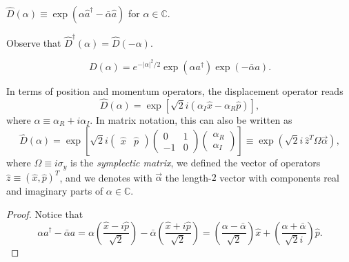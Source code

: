 \documentclass[12pt]{report}
\newcommand{\CC}{\mathbb{C}}
\begin{document}
\begin{defn}
	$\hat D(\alpha) \equiv \exp(\alpha \hat a^\dagger-\bar\alpha \hat a)$ for $\alpha\in\CC$.
\end{defn}
Observe that $\hat D^\dagger(\alpha)=\hat D(-\alpha)$.

\begin{prop}
	\begin{equation}
		D(\alpha)
		= e^{-\lvert\alpha\rvert^2/2}
			\exp(\alpha a^\dagger)\exp(-\bar\alpha a).
	\end{equation}
\end{prop}

\begin{prop}
	In terms of position and momentum operators, the displacement operator reads
	\begin{equation}
		\hat D(\alpha)
		= \exp[\sqrt2 i(\alpha_I \hat x - \alpha_R \hat p)],
	\end{equation}
	where $\alpha\equiv \alpha_R+i\alpha_I$.
	In matrix notation, this can also be written as
	\begin{equation}
		\hat D(\alpha)
		= \exp\left[\sqrt2 i \begin{pmatrix}
			\hat x & \hat p
		\end{pmatrix}
		\begin{pmatrix}
			0 & 1 \\ -1 & 0
		\end{pmatrix}
		\begin{pmatrix}
			\alpha_R \\ \alpha_I
		\end{pmatrix}\right]
		\equiv \exp(\sqrt2 i\, \hat z^T \Omega \vec\alpha),
	\end{equation}
	where $\Omega\equiv i\sigma_y$ is the \emph{symplectic matrix}, we defined the vector of operators $\hat z\equiv (\hat x,\hat p)^T$, and we denotes with $\vec \alpha$ the length-$2$ vector with components real and imaginary parts of $\alpha\in\CC$.
\end{prop}
\begin{proof}
	Notice that
	\begin{equation}
		\alpha a^\dagger - \bar\alpha a
		= \alpha \left(\frac{\hat x-i\hat p}{\sqrt2}\right)
		- \bar\alpha\left(\frac{\hat x + i\hat p}{\sqrt2}\right)
		= \left(\frac{\alpha-\bar\alpha}{\sqrt2}\right) \hat x
		+ \left(\frac{\alpha+\bar\alpha}{\sqrt2 i}\right) \hat p.
	\end{equation}
\end{proof}
\end{document}
